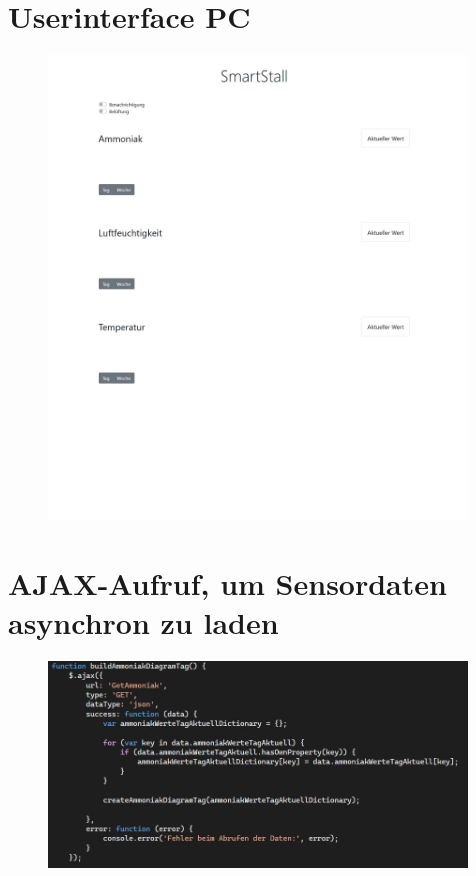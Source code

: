 \documentclass[conference]{IEEEtran}
\begin{document}
\begin{appendices}
\clearpage
\section{Userinterface PC}
\label{sec:uiPCAnhang}
\begin{figure}[h]
    \centering
    \includegraphics[width=0.99\textwidth]{fig/uiPC.jpg}
\end{figure}

\clearpage
\section{AJAX-Aufruf, um Sensordaten asynchron zu laden}
\label{sec:ajaxAnhang}
\begin{figure}[h]
    \centering
    \includegraphics[width=0.99\textwidth]{fig/ajax.JPG}
\end{figure}

\end{appendices}
\end{document}
